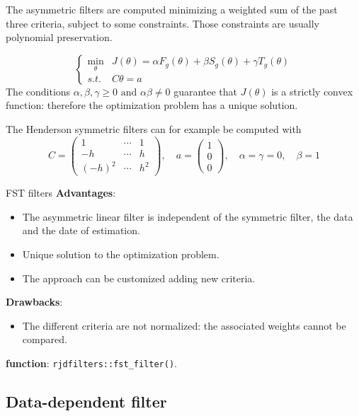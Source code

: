 \documentclass[fleqn,10pt]{latex/stylish_article} %
\providecommand{\tightlist}{%
  \setlength{\itemsep}{0pt}\setlength{\parskip}{0pt}}
\newcommand\1{\mathds{1}}
\begin{document}
The asymmetric filters are computed minimizing a weighted sum of the past three criteria, subject to some constraints. Those constraints are usually polynomial preservation.

\[
\begin{cases}
\underset{\theta}{\min} & J(\theta)=
\alpha F_g(\theta)+\beta S_g(\theta)+\gamma T_g(\theta)\\
s.t. & C\theta=a
\end{cases}
\]
The conditions \(\alpha,\beta,\gamma\geq 0\text{ and }\alpha\beta\ne 0\) guarantee that \(J(\theta)\) is a strictly convex function: therefore the optimization problem has a unique solution.

The Henderson symmetric filters can for example be computed with
\[C=\begin{pmatrix}
1 & \cdots&1\\
-h & \cdots&h \\
(-h)^2 & \cdots&h^2
\end{pmatrix},\quad
a=\begin{pmatrix}
1 \\0\\0
\end{pmatrix},\quad
\alpha=\gamma=0,\quad
\beta=1\]

\begin{summary}{FST filters}
\textbf{Advantages}:

\begin{itemize}
\item
  The asymmetric linear filter is independent of the symmetric filter, the data and the date of estimation.
\item
  Unique solution to the optimization problem.
\item
  The approach can be customized adding new criteria.
\end{itemize}

\textbf{Drawbacks}:

\begin{itemize}
\tightlist
\item
  The different criteria are not normalized: the associated weights cannot be compared.
\end{itemize}

\textbf{\faRProject{} function}: \texttt{rjdfilters::fst\_filter()}.

\end{summary}

\hypertarget{sec:WildiMcLeroy}{%
\subsection{Data-dependent filter}\label{sec:WildiMcLeroy}}
\end{document}
